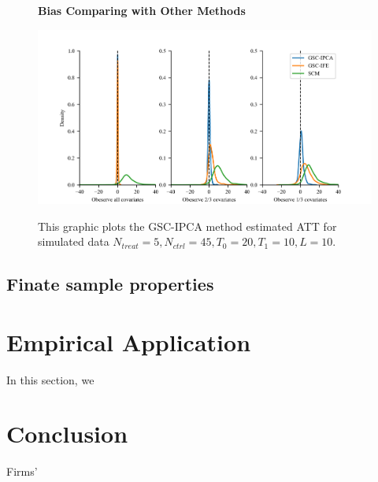 \documentclass[12pt]{article}
\begin{document}
\begin{figure}[!ht]
    \centering
    \caption{\textbf{Bias Comparing with Other Methods}}
    \includegraphics{figs/bias_compar1.png}
    \label{fig: bias}
    \caption*{\footnotesize{This graphic plots the GSC-IPCA method estimated ATT for simulated data $N_{treat} = 5, N_{ctrl} = 45, T_0=20, T_1=10, L=10$.}}
    \end{figure}

\subsection{Finate sample properties}

\section{Empirical Application}
\label{sec: application}

In this section, we
\section{Conclusion} 
\label{sec: conclusion}

Firms' 

\clearpage
\begingroup
{}


\endgroup

\clearpage
\setcounter{figure}{0}
\setcounter{table}{0}
\renewcommand\thetable{\Alph{section}.\arabic{table}}
\renewcommand\thefigure{\Alph{section}.\arabic{figure}}
\end{document}
